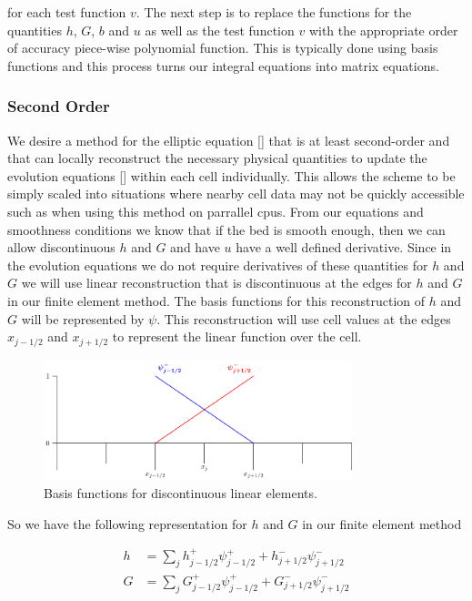 for each test function $v$. The next step is to replace the functions for the quantities $h$, $G$, $b$ and $u$ as well as the test function $v$ with the appropriate order of accuracy piece-wise polynomial function. This is typically done using basis functions and this process turns our integral equations into matrix equations.

\subsubsection{Second Order}
We desire a method for the elliptic equation [] that is at least second-order and that can locally reconstruct the necessary physical quantities to update the evolution equations [] within each cell individually. This allows the scheme to be simply scaled into situations where nearby cell data may not be quickly accessible such as when using this method on parrallel cpus. From our equations and smoothness conditions we know that if the bed is smooth enough, then we can allow discontinuous $h$ and $G$ and have $u$ have a well defined derivative. Since in the evolution equations we do not require derivatives of these quantities for $h$ and $G$ we will use linear reconstruction that is discontinuous at the edges for $h$ and $G$ in our finite element method. The basis functions for this reconstruction of $h$ and $G$ will be represented by $\psi$. This reconstruction will use cell values at the edges $x_{j-1/2}$ and $x_{j + 1/2}$ to represent the linear function over the cell.

\begin{figure}
	\centering
	\includegraphics[width=0.8\textwidth]{./chp3/figures/P1.pdf}
	\caption{Basis functions for discontinuous linear elements.}
	\label{fig:P1DiscBasis}
\end{figure}


So we have the following representation for $h$ and $G$ in our finite element method

\begin{align*}
h &= \sum_j h^+_{j-1/2}\psi^+_{j-1/2}  + h^-_{j+1/2}\psi^-_{j+1/2} \\
G &= \sum_j G^+_{j-1/2}\psi^+_{j-1/2}  + G^-_{j+1/2}\psi^-_{j+1/2}
\end{align*}

